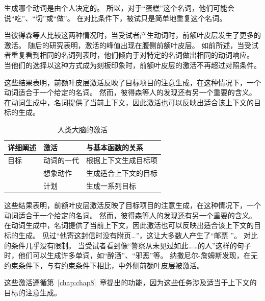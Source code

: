 生成哪个动词是由个人决定的。
所以，对于“蛋糕”这个名词，他们可能会说“吃”、“切”或“做”。
在对比条件下，被试只是简单地重复这个名词。
\par

当彼得森等人比较这两种情况时，当受试者产生动词时，前额叶皮层发生了更多的激活。
随后的研究表明，激活的峰值出现在腹侧前额叶皮层\cite{buckner1995dissociation}。
如前所述，当受试者重复看到相同的名词列表时，他们倾向于对特定的名词做出相同的动词响应\cite{raichle1994practice}。
当他们的选择以这种方式成为刻板印象时，前额叶皮层的激活不再超过对照条件。
\par


这些结果表明，前额叶皮层激活反映了目标项目的注意生成，在这种情况下，一个动词适合于一个给定的名词。
然而，彼得森等人的发现还有另一个重要的含义。
在动词生成中，名词提供了当前上下文，因此激活也可以反映出适合该上下文的目标的生成。
\par


\begin{table}[htbp] 
	\newcommand{\tabincell}[2]{\begin{tabular}{@{}#1@{}}#2\end{tabular}} %
	\centering
	\caption{人类大脑的激活\label{tab:9_2}}
	\renewcommand\arraystretch{1.5}	%
	\begin{tabular}{lll}
		\toprule
		详细阐述 & 激活 & 与基本函数的关系\\
		\midrule
		目标 & 动词的一代 & 根据上下文生成目标项  \\
		& 想象动作 & 生成适合上下文的目标 \\
		&  计划 & 生成一系列目标 \\
		\bottomrule
		
	\end{tabular}%
\end{table}%


这些结果表明，前额叶皮层激活反映了目标项目的注意生成，在这种情况下，一个动词适合于一个给定的名词。
然而，彼得森等人的发现还有另一个重要的含义。
在动词生成中，名词提供了当前上下文，因此激活也可以反映出适合该上下文的目标的生成。
见过“他寄这封信时没有附页…”，这让大多数人产生了“邮票 ”。
对比的条件几乎没有限制。
当受试者看到像“警察从未见过如此……的人”这样的句子时，他们可以生成许多单词，如“醉酒”、“邪恶”等。
纳撒尼尔-詹姆斯发现，在无约束条件下，与有约束条件下相比，中外侧前额叶皮层被激活。
\par


这些激活遵循第~\ref{chap:chap8}~章提出的功能，因为这些任务涉及适当于上下文的目标的注意生成。



